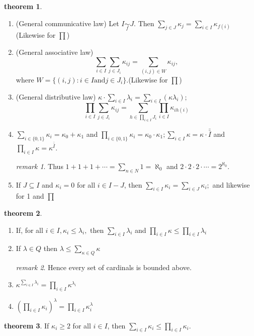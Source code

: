 \documentclass[a4paper,11pt]{article}%
\theoremstyle{remark}
\newtheorem*{remark}{remark}
\theoremstyle{definition}
\newtheorem{theorem}{theorem}[section]
\theoremstyle{definition}
\theoremstyle{plain}
\theoremstyle{definition}
\begin{document}
\begin{theorem}
    \begin{enumerate}
   \item (General communicative law) Let $I\underset{f}{\sim}J$. Then $\sum_{j\in J}\kappa_j=\sum_{i\in I}\kappa_{f(i)}$(Likewise for $\prod$)
   \item (General associative law)  \[\sum_{i\in I}\sum_{j\in J_i}\kappa _{ij}=\sum_{(i,j)\in W}\kappa _{ij},\]where $W=\{(i,j):i\in I \text{and} j\in J_i\}$.(Likewise for $\prod$)
   \item (General distributive law) $\kappa\cdot\sum_{i\in I}\lambda_i=\sum_{i\in I}(\kappa\lambda_i);$
   \[\prod_{i\in I}\sum_{j\in J_i}\kappa _{ij}=\sum_{h\in \prod_{i\in I}J_i}\prod_{i\in I}\kappa_{ih(i)}\]
   \item $\sum_{i\in \{0,1\}}\kappa_i=\kappa_0+\kappa_1$ and $\prod_{i\in \{0,1\}}\kappa_i=\kappa_0\cdot\kappa_1;\sum_{i\in I}\kappa=\kappa\cdot \bar{\bar{I}}$ and $\prod_{i\in I}\kappa=\kappa^{\bar{\bar{I}}}.$
\begin{remark}
    Thus $1+1+1+\cdots=\sum_{n\in N}1=\aleph_0$ and $2\cdot 2\cdot2\cdot \cdots =2^{\aleph_0}$.
\end{remark}
\item If $J\subseteq I$ and $\kappa_i=0$ for all $i\in I-J$, then $\sum_{i\in I}\kappa_i=\sum_{i\in J}\kappa_i;$ and likewise for 1 and $\prod$ 
    \end{enumerate}
\end{theorem}
\begin{theorem}
    \begin{enumerate}
        \item If, for all $i\in I,\kappa_i\leq\lambda_i, $ then $\sum_{i\in I}\lambda_i$ and $\prod_{i\in I}\kappa\leq\prod_{i\in I}\lambda_i$
        \item If $\lambda\in Q$ then $\lambda\leq\sum_{\kappa\in Q}\kappa$\begin{remark}
            Hence every set of cardinals is bounded above.
        \end{remark}
        \item $\kappa^{\sum_{i\in I}\lambda_i}=\prod_{i\in I}\kappa^{\lambda_i}$
        \item $(\prod_{i\in I}\kappa_i)^{\lambda}=\prod_{i\in I}\kappa_i^{\lambda}$
    \end{enumerate}
\end{theorem}
\begin{theorem}
    If $\kappa_i\geq 2$ for all $i\in I$, then $\sum_{i\in I}\kappa_i\leq\prod_{i\in I}\kappa_i$.
\end{theorem}
\end{document}
